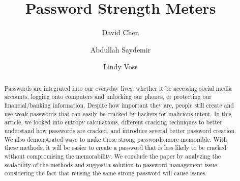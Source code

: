 \documentclass[acmsmall,nonacm]{acmart}
\begin{document}
\title{Password Strength Meters}

\author{David Chen}

\author{Abdullah Saydemir}

\author{Lindy Voss}


\renewcommand{\shortauthors}{Chen, Voss, \& Saydemir}

\begin{abstract}
    Passwords are integrated into our everyday lives, whether it be accessing social media accounts, logging onto computers and unlocking our phones, or protecting our financial/banking information. Despite how important they are, people still create and use weak passwords that can easily be cracked by hackers for malicious intent. In this article, we looked into entropy calculations, different cracking techniques to better understand how passwords are cracked, and introduce several better password creation. We also demonstrated ways to make those strong passwords more memorable. With these methods, it will be easier to create a password that is less likely to be cracked without compromising the memorability. We conclude the paper by analyzing the scalability of the methods and suggest a solution to password management issue considering the fact that reusing the same strong password will cause issues.
\end{abstract}
\end{document}
